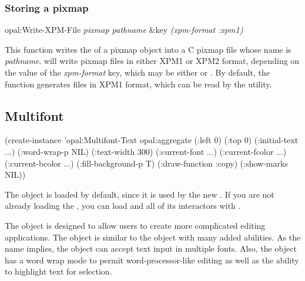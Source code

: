 \begin{group}
\subsection{Storing a pixmap}

\vspace{1 line}
\begin{programexample}
opal:Write-XPM-File {\it pixmap pathname} \&key {\it (xpm-format :xpm1)} \value{Function}
\end{programexample}

This function writes the  of a pixmap object into a C pixmap file
whose name is {\it pathname}.   will write pixmap files in
either XPM1 or XPM2 format, depending on the value of the {\it xpm-format} key,
which may be either  or .  By default, the function
generates files in XPM1 format, which can be read by the 
utility.
\end{group}



\begin{group}
\chapter{Multifont}

\begin{programexample}
(create-instance 'opal:Multifont-Text opal:aggregate
   (:left 0)
   (:top 0)
   (:initial-text ...)
   (:word-wrap-p NIL)
   (:text-width 300)
   (:current-font ...)
   (:current-fcolor ...)
   (:current-bcolor ...)
   (:fill-background-p T)
   (:draw-function :copy)
   (:show-marks NIL))
\end{programexample}

The  object is loaded by default, since it is used
by the new .  If you are not already
loading the , you can load  and all
of its interactors with {\obeyspaces {}}.
\end{group}
\vspace{1 line}

The  object is designed to allow users to create more
complicated editing applications.  The object is similar to the
 object with many added abilities.  As the name implies,
the  object can accept text input in multiple fonts.
Also, the object has a word wrap mode to permit word-processor-like editing as
well as the ability to highlight text for selection.

